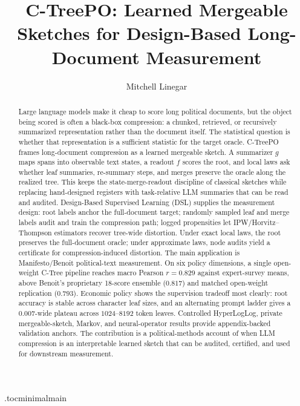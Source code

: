 \documentclass[11pt]{article}
\title{C-TreePO: Learned Mergeable Sketches for Design-Based Long-Document Measurement}
\author{Mitchell Linegar}
\date{}
\begin{document}
\maketitle

\begin{abstract}
Large language models make it cheap to score long political documents, but the
object being scored is often a black-box compression: a chunked, retrieved, or
recursively summarized representation rather than the document itself. The
statistical question is whether that representation is a sufficient statistic
for the target oracle. C-TreePO frames long-document compression as a learned
mergeable sketch. A summarizer $g$ maps spans into observable text states, a
readout $f$ scores the root, and local laws ask whether leaf summaries,
re-summary steps, and merges preserve the oracle along the realized tree. This
keeps the state-merge-readout discipline of classical sketches while replacing
hand-designed registers with task-relative LLM summaries that can be read and
audited. Design-Based Supervised Learning (DSL) supplies the measurement
design: root labels anchor the full-document target; randomly sampled leaf and
merge labels audit and train the compression path; logged propensities let
IPW/Horvitz--Thompson estimators recover tree-wide distortion. Under exact
local laws, the root preserves the full-document oracle; under approximate
laws, node audits yield a certificate for compression-induced distortion. The
main application is Manifesto/Benoit political-text measurement. On six policy
dimensions, a single open-weight C-Tree pipeline reaches macro Pearson
$r=0.829$ against expert-survey means, above Benoit's proprietary 18-score
ensemble ($0.817$) and matched open-weight replication ($0.793$). Economic
policy shows the supervision tradeoff most clearly: root accuracy is stable
across character leaf sizes, and an alternating prompt ladder gives a
$0.007$-wide plateau across $1024$--$8192$ token leaves. Controlled
HyperLogLog, private mergeable-sketch, Markov, and neural-operator results
provide appendix-backed validation anchors. The contribution is a
political-methods account of when LLM compression is an interpretable learned
sketch that can be audited, certified, and used for downstream measurement.
\end{abstract}

\tableofcontents
\clearpage

\etocdepthtag.toc{minimalmain}







\end{document}
